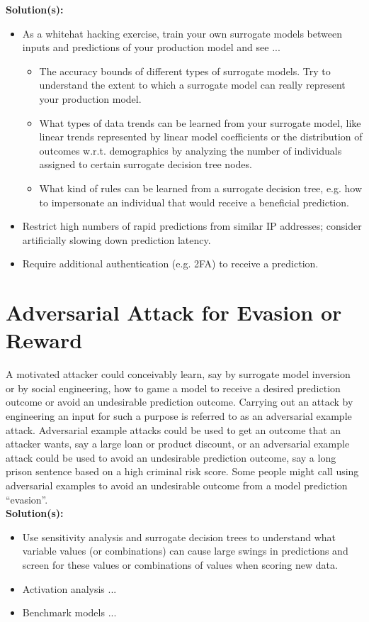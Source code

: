 \documentclass[fleqn]{article}
\begin{document}
\noindent\textbf{Solution(s):}
\begin{itemize}
\item As a whitehat hacking exercise, train your own surrogate models between inputs and predictions of your production model and see ...
	\begin{itemize}
	\item The accuracy bounds of different types of surrogate models. Try to understand the extent to which a surrogate model can really represent your production model. 
	\item What types of data trends can be learned from your surrogate model, like linear trends represented by linear model coefficients or the distribution of outcomes w.r.t. demographics by analyzing the number of individuals assigned to certain surrogate decision tree nodes.
	\item What kind of rules can be learned from a surrogate decision tree, e.g. how to impersonate an individual that would receive a beneficial prediction. 
	\end{itemize}
\item Restrict high numbers of rapid predictions from similar IP addresses; consider artificially slowing down prediction latency.
\item Require additional authentication (e.g. 2FA) to receive a prediction.
\end{itemize}

\section{Adversarial Attack for Evasion or Reward}
 
A motivated attacker could conceivably learn, say by surrogate model inversion or by social engineering, how to game a model to receive a desired prediction outcome or avoid an undesirable prediction outcome. Carrying out an attack by engineering an input for such a purpose is referred to as an adversarial example attack. Adversarial example attacks could be used to get an outcome that an attacker wants, say a large loan or product discount, or an adversarial example attack could be used to avoid an undesirable prediction outcome, say a long prison sentence based on a high criminal risk score. Some people might call using adversarial examples to avoid an undesirable outcome from a model prediction ``evasion''.\\

\noindent\textbf{Solution(s):} 
\begin{itemize}
\item Use sensitivity analysis and surrogate decision trees to understand what variable values (or combinations) can cause large swings in predictions and screen for these values or combinations of values when scoring new data.
\item Activation analysis ...
\item Benchmark models ...
\end{itemize}
\end{document}
